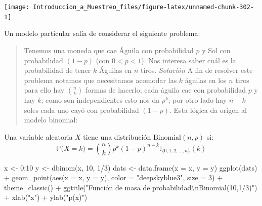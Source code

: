 \documentclass[
]{book}
\newenvironment{Shaded}{\begin{snugshade}}{\end{snugshade}}
\newcommand{\AttributeTok}[1]{\textcolor[rgb]{0.77,0.63,0.00}{#1}}
\newcommand{\DecValTok}[1]{\textcolor[rgb]{0.00,0.00,0.81}{#1}}
\newcommand{\FunctionTok}[1]{\textcolor[rgb]{0.00,0.00,0.00}{#1}}
\newcommand{\NormalTok}[1]{#1}
\newcommand{\OtherTok}[1]{\textcolor[rgb]{0.56,0.35,0.01}{#1}}
\newcommand{\SpecialCharTok}[1]{\textcolor[rgb]{0.00,0.00,0.00}{#1}}
\newcommand{\StringTok}[1]{\textcolor[rgb]{0.31,0.60,0.02}{#1}}
\begin{document}
\begin{center}\texttt{[image: Introduccion\_a\_Muestreo\_files/figure-latex/unnamed-chunk-302-1]} \end{center}

Un modelo particular salía de considerar el siguiente problema:

\begin{quote}
Tenemos una moneda que cae Águila con probabilidad \(p\) y Sol con probabilidad \((1-p)\) (con \(0 < p < 1\)). Nos interesa saber cuál es la probabilidad de tener \(k\) Águilas en \(n\) tiros.
\emph{Solución} A fin de resolver este problema notamos que necesitamos acomodar las \(k\) águilas en los \(n\) tiros para ello hay \(\binom{n}{k}\) formas de hacerlo; cada águila cae con probabilidad \(p\) y hay \(k\); como son independientes esto nos da \(p^k\); por otro lado hay \(n-k\) soles cada uno cayó con probabilidad \((1-p)\). Esta lógica da origen al modelo binomial:
\end{quote}

Una variable aleatoria \(X\) tiene una distribución \(\text{Binomial}(n,p)\) si:
\[
\mathbb{P}\big(X = k \big) = \binom{n}{k} p^k (1-p)^{n-k} \mathbb{I}_{\{0,1,2,\dots,n \}}(k)
\]

\begin{Shaded}
\begin{Highlighting}[]
\NormalTok{x }\OtherTok{\textless{}{-}} \DecValTok{0}\SpecialCharTok{:}\DecValTok{10}
\NormalTok{y }\OtherTok{\textless{}{-}} \FunctionTok{dbinom}\NormalTok{(x, }\DecValTok{10}\NormalTok{, }\DecValTok{1}\SpecialCharTok{/}\DecValTok{3}\NormalTok{)}
\NormalTok{dats }\OtherTok{\textless{}{-}} \FunctionTok{data.frame}\NormalTok{(}\AttributeTok{x =}\NormalTok{ x, }\AttributeTok{y =}\NormalTok{ y)}
\FunctionTok{ggplot}\NormalTok{(dats) }\SpecialCharTok{+} \FunctionTok{geom\_point}\NormalTok{(}\FunctionTok{aes}\NormalTok{(}\AttributeTok{x =}\NormalTok{ x, }\AttributeTok{y =}\NormalTok{ y), }\AttributeTok{color =} \StringTok{"deepskyblue3"}\NormalTok{, }\AttributeTok{size =} \DecValTok{3}\NormalTok{) }\SpecialCharTok{+} \FunctionTok{theme\_classic}\NormalTok{() }\SpecialCharTok{+} \FunctionTok{ggtitle}\NormalTok{(}\StringTok{"Función de masa de probabilidad}\SpecialCharTok{\textbackslash{}n}\StringTok{Binomial(10,1/3)"}\NormalTok{) }\SpecialCharTok{+}
  \FunctionTok{xlab}\NormalTok{(}\StringTok{"x"}\NormalTok{) }\SpecialCharTok{+} \FunctionTok{ylab}\NormalTok{(}\StringTok{"p(x)"}\NormalTok{)}
\end{Highlighting}
\end{Shaded}
\end{document}
